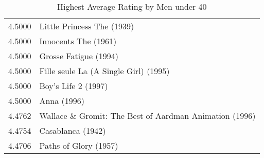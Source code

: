 \begin{flushleft}
\begin{table}[h]
\begin{tabular}{ll}
4.5000 & Little Princess The (1939)                              \\
4.5000 & Innocents The (1961)                                    \\
4.5000 & Grosse Fatigue (1994)                                   \\
4.5000 & Fille seule La (A Single Girl) (1995)                   \\
4.5000 & Boy's Life 2 (1997)                                     \\
4.5000 & Anna (1996)                                             \\  \hline
4.4762 & Wallace \& Gromit: The Best of Aardman Animation (1996) \\ \hline
4.4754 & Casablanca (1942)                                       \\ \hline
4.4706 & Paths of Glory (1957)                                   \\

\end{tabular}
\caption{Highest Average Rating by Men under 40}
\end{table}


\end{flushleft}




